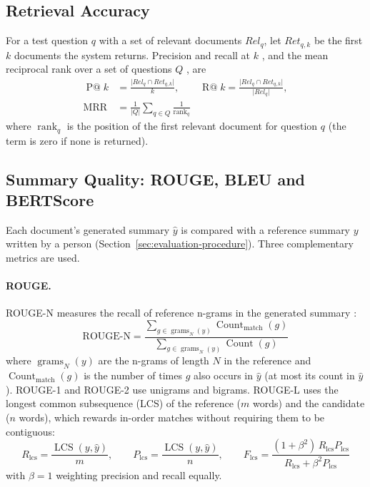 \subsection{Retrieval Accuracy}\label{sec:retrieval-metrics}

For a test question $q$ with a set of relevant documents $\mathit{Rel}_q$, let $\mathit{Ret}_{q,k}$ be the first $k$ documents the system returns. Precision and recall at $k$ \citep{manning2008}, and the mean reciprocal rank over a set of questions $Q$ \citep{voorhees1999}, are
\begin{align}
  \operatorname{P@}k &= \frac{\lvert \mathit{Rel}_q \cap \mathit{Ret}_{q,k} \rvert}{k}, \qquad
  \operatorname{R@}k = \frac{\lvert \mathit{Rel}_q \cap \mathit{Ret}_{q,k} \rvert}{\lvert \mathit{Rel}_q \rvert}, \label{eq:precision-recall}\\[4pt]
  \operatorname{MRR} &= \frac{1}{\lvert Q \rvert} \sum_{q \in Q} \frac{1}{\operatorname{rank}_q} \label{eq:mrr}
\end{align}
where $\operatorname{rank}_q$ is the position of the first relevant document for question $q$ (the term is zero if none is returned).

\subsection{Summary Quality: ROUGE, BLEU and BERTScore}\label{sec:summary-metrics}

Each document's generated summary $\hat{y}$ is compared with a reference summary $y$ written by a person (Section~\ref{sec:evaluation-procedure}). Three complementary metrics are used.

\paragraph{ROUGE.} ROUGE-N measures the recall of reference n-grams in the generated summary \citep{lin2004rouge}:
\begin{equation}
  \text{ROUGE-N} = \frac{\sum_{g \in \operatorname{grams}_N(y)} \operatorname{Count}_{\text{match}}(g)}{\sum_{g \in \operatorname{grams}_N(y)} \operatorname{Count}(g)} \label{eq:rouge-n}
\end{equation}
where $\operatorname{grams}_N(y)$ are the n-grams of length $N$ in the reference and $\operatorname{Count}_{\text{match}}(g)$ is the number of times $g$ also occurs in $\hat{y}$ (at most its count in $\hat{y}$). ROUGE-1 and ROUGE-2 use unigrams and bigrams. ROUGE-L uses the longest common subsequence (LCS) of the reference ($m$ words) and the candidate ($n$ words), which rewards in-order matches without requiring them to be contiguous:
\begin{equation}
  R_{\text{lcs}} = \frac{\operatorname{LCS}(y, \hat{y})}{m}, \qquad
  P_{\text{lcs}} = \frac{\operatorname{LCS}(y, \hat{y})}{n}, \qquad
  F_{\text{lcs}} = \frac{(1 + \beta^2)\, R_{\text{lcs}} P_{\text{lcs}}}{R_{\text{lcs}} + \beta^2 P_{\text{lcs}}} \label{eq:rouge-l}
\end{equation}
with $\beta = 1$ weighting precision and recall equally.

